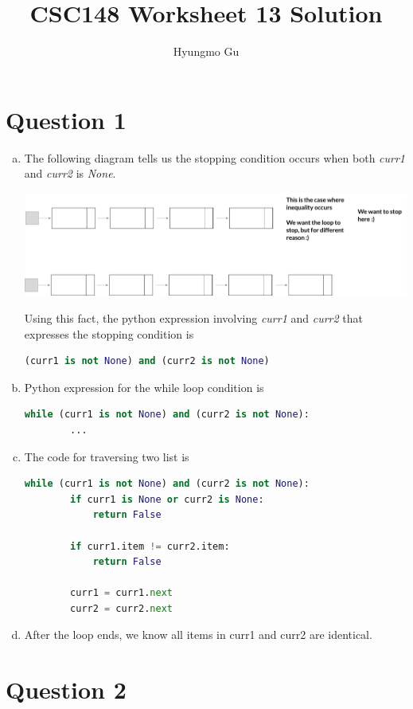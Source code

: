 \documentclass[12pt]{article}
\begin{document}
\title{CSC148 Worksheet 13 Solution}
\author{Hyungmo Gu}
\maketitle

\section*{Question 1}
\begin{enumerate}[a.]
    \item

    The following diagram tells us the stopping condition occurs when both
    \textit{curr1} and \textit{curr2} is \textit{None}.

    \begin{center}
    \includegraphics[width=\linewidth]{images/worksheet_13_q1a_solution.png}
    \end{center}

    \bigskip

    Using this fact, the python expression involving \textit{curr1}
    and \textit{curr2} that expresses the stopping condition is

    \bigskip

    \begin{lstlisting}[language=Python]
    (curr1 is not None) and (curr2 is not None)
    \end{lstlisting}

    \item

    Python expression for the while loop condition is

    \begin{lstlisting}[language=Python]
    while (curr1 is not None) and (curr2 is not None):
        ...
    \end{lstlisting}

    \item

    The code for traversing two list is

    \begin{lstlisting}[language=Python]
    while (curr1 is not None) and (curr2 is not None):
        if curr1 is None or curr2 is None:
            return False

        if curr1.item != curr2.item:
            return False

        curr1 = curr1.next
        curr2 = curr2.next
    \end{lstlisting}

    \item

    After the loop ends, we know all items in curr1 and curr2 are identical.

\end{enumerate}

\section*{Question 2}
\end{document}
